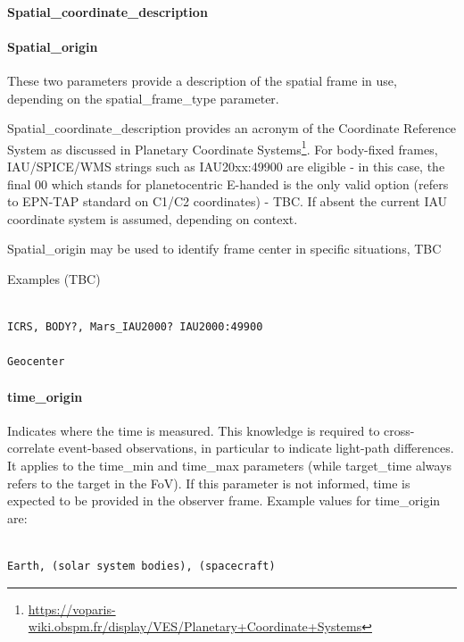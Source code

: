 \documentclass[11pt,a4paper]{ivoa}
\begin{document}
\paragraph{Spatial\_coordinate\_description}

\paragraph{Spatial\_origin}

These two parameters provide a description of the spatial frame in use, depending on the spatial\_frame\_type parameter. 

Spatial\_coordinate\_description provides an acronym of the Coordinate Reference System as discussed in Planetary Coordinate Systems\footnote{\url{https://voparis-wiki.obspm.fr/display/VES/Planetary+Coordinate+Systems}}. For body-fixed frames, IAU/SPICE/WMS strings such as IAU20xx:49900 are eligible - in this case, the final 00 which stands for planetocentric E-handed is the only valid option (refers to EPN-TAP standard on C1/C2 coordinates) - TBC. If absent the current IAU coordinate system is assumed, depending on context. 

Spatial\_origin may be used to identify frame center in specific situations, TBC

Examples (TBC)

\begin{verbatim}

ICRS, BODY?, Mars_IAU2000? IAU2000:49900

Geocenter

\end{verbatim}

\paragraph{time\_origin}

Indicates where the time is measured. This knowledge is required to cross-correlate event-based observations, in particular to indicate light-path differences. It applies to the time\_min and time\_max parameters (while target\_time always refers to the target in the FoV). If this parameter is not informed, time is expected to be provided in the observer frame. Example values for time\_origin are:

\begin{verbatim}

Earth, (solar system bodies), (spacecraft)

\end{verbatim}
\end{document}

